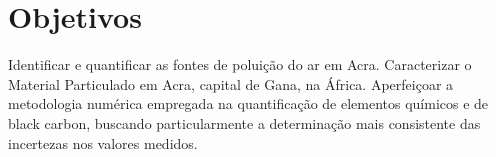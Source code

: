\section{Objetivos}

Identificar e quantificar as fontes de poluição do ar em Acra.
Caracterizar o Material Particulado em Acra, capital de Gana, na África.
Aperfeiçoar a metodologia numérica empregada na quantificação de elementos 
químicos e de black carbon, buscando particularmente a determinação mais
consistente das incertezas nos valores medidos.
